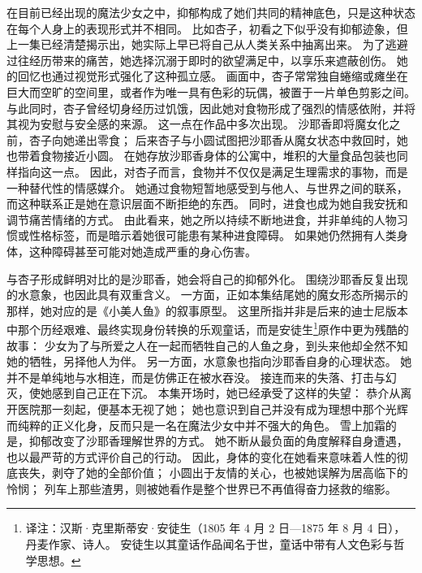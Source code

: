 在目前已经出现的魔法少女之中，抑郁构成了她们共同的精神底色，只是这种状态在每个人身上的表现形式并不相同。
比如杏子，初看之下似乎没有抑郁迹象，但上一集已经清楚揭示出，她实际上早已将自己从人类关系中抽离出来。
为了逃避过往经历带来的痛苦，她选择沉溺于即时的欲望满足中，以享乐来遮蔽创伤。
她的回忆也通过视觉形式强化了这种孤立感。
画面中，杏子常常独自蜷缩或瘫坐在巨大而空旷的空间里，或者作为唯一具有色彩的玩偶，被置于一片单色剪影之间。
与此同时，杏子曾经切身经历过饥饿，因此她对食物形成了强烈的情感依附，并将其视为安慰与安全感的来源。
这一点在作品中多次出现。
沙耶香即将魔女化之前，杏子向她递出零食；
后来杏子与小圆试图把沙耶香从魔女状态中救回时，她也带着食物接近小圆。
在她存放沙耶香身体的公寓中，堆积的大量食品包装也同样指向这一点。
因此，对杏子而言，食物并不仅仅是满足生理需求的事物，而是一种替代性的情感媒介。
她通过食物短暂地感受到与他人、与世界之间的联系，而这种联系正是她在意识层面不断拒绝的东西。
同时，进食也成为她自我安抚和调节痛苦情绪的方式。
由此看来，她之所以持续不断地进食，并非单纯的人物习惯或性格标签，而是暗示着她很可能患有某种进食障碍。
如果她仍然拥有人类身体，这种障碍甚至可能对她造成严重的身心伤害。

与杏子形成鲜明对比的是沙耶香，她会将自己的抑郁外化。
围绕沙耶香反复出现的水意象，也因此具有双重含义。
一方面，正如本集结尾她的魔女形态所揭示的那样，她对应的是《小美人鱼》的叙事原型。
这里所指并非是后来的迪士尼版本中那个历经艰难、最终实现身份转换的乐观童话\cite{mardoll2012little-mermaid}，而是安徒生\footnote{%
    译注：汉斯·克里斯蒂安·安徒生（1805 年 4 月 2 日—1875 年 8 月 4 日），丹麦作家、诗人。
    安徒生以其童话作品闻名于世，童话中带有人文色彩与哲学思想。
}原作中更为残酷的故事：
少女为了与所爱之人在一起而牺牲自己的人鱼之身，到头来他却全然不知她的牺牲，另择他人为伴\cite{andersen1999little-mermaid}。
另一方面，水意象也指向沙耶香自身的心理状态。
她并不是单纯地与水相连，而是仿佛正在被水吞没。
接连而来的失落、打击与幻灭，使她感到自己正在下沉。
本集开场时，她已经承受了这样的失望：
恭介从离开医院那一刻起，便基本无视了她；
她也意识到自己并没有成为理想中那个光辉而纯粹的正义化身，反而只是一名在魔法少女中并不强大的角色。
雪上加霜的是，抑郁改变了沙耶香理解世界的方式。
她不断从最负面的角度解释自身遭遇，也以最严苛的方式评价自己的行动。
因此，身体的变化在她看来意味着人性的彻底丧失，剥夺了她的全部价值；
小圆出于友情的关心，也被她误解为居高临下的怜悯；
列车上那些渣男，则被她看作是整个世界已不再值得奋力拯救的缩影。

